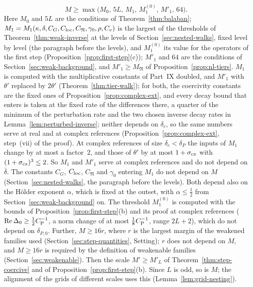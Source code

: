 \begin{remark}[Parameters]
\begin{enumerate}[label=(\arabic*)]
\[
M\ge\max\big(M_0,\,5L,\,M_1,\,M_1^{(0)},\,M'_1,\,64\big).
\]
Here $M_0$ and $5L$ are the conditions of Theorem~\ref{thm:balaban}; $M_1=M_1(\kappa,\delta,C_G,C_{\rm loc},C_{\mathfrak N},\gamma_0,\rho,C_v)$ is the largest of the thresholds of Theorem~\ref{thm:weak-inverse} at the levels of Section~\ref{sec:nested-walks}, fixed level by level (the paragraph before the levels), and $M_1^{(0)}$ its value for the operators of the first step (Proposition~\ref{prop:first-step}(c)); $M'_1$ and $64$ are the conditions of Section~\ref{sec:weak-background}, and $M'_1\ge M_{\mathfrak N}$ of Proposition~\ref{prop:nl-tiers}. $M_1$ is computed with the multiplicative constants of Part~IX doubled, and $M'_1$ with $\theta'$ replaced by $2\theta'$ (Theorem~\ref{thm:tier-walk}); for both, the coercivity constants are the fixed ones of Proposition~\ref{prop:complex-ext}, and every decay bound that enters is taken at the fixed rate of the differences there, a quarter of the minimum of the perturbation rate and the two chosen inverse decay rates in Lemma~\ref{lem:perturbed-inverse}; neither depends on $\delta_c$, so the same numbers serve at real and at complex references (Proposition~\ref{prop:complex-ext}, step~(vii) of the proof). At complex references of size $\delta_c<\delta_P$ the inputs of $M_1$ change by at most a factor~$2$, and those of $\theta'$ by at most $1+\sigma_{\rm cx}$ with $(1+\sigma_{\rm cx})^3\le2$. So $M_1$ and $M'_1$ serve at complex references and do not depend on $\bar\delta$. The constants $C_G$, $C_{\rm loc}$, $C_{\mathfrak N}$ and $\gamma_0$ entering $M_1$ do not depend on $M$ (Section~\ref{sec:nested-walks}, the paragraph before the levels). Both depend also on the H\"older exponent $\alpha$, which is fixed at the outset, with $\alpha\le\frac12$ from Section~\ref{sec:weak-background} on. The threshold $M_1^{(0)}$ is computed with the bounds of Proposition~\ref{prop:first-step}(b) and its proof at complex references ($\operatorname{Re}\Delta_0\ge\frac12C_{\rm P}^{-1}$, a norm change of at most $\frac18C_{\rm P}^{-1}$, range $2L+2$), which do not depend on $\delta_{P,0}$. Further, $M\ge16r$, where $r$ is the largest margin of the weakened families used (Section~\ref{sec:step-quantities}, Setting); $r$ does not depend on $M$, and $M\ge16r$ is required by the definition of weakenable families (Section~\ref{sec:weakenable}). Then the scale $M'\ge M'_L$ of Theorem~\ref{thm:step-coercive} and of Proposition~\ref{prop:first-step}(b). Since $L$ is odd, so is $M$; the alignment of the grids of different scales uses this (Lemma~\ref{lem:grid-nesting}).

\end{enumerate}
\end{remark}
